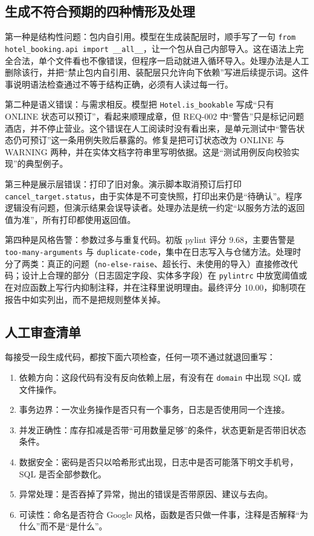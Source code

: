 \documentclass[11pt,a4paper,fontset=none]{ctexart}
\begin{document}
\subsection{生成不符合预期的四种情形及处理}

第一种是结构性问题：包内自引用。模型在生成装配层时，顺手写了一句 \texttt{from hotel\_booking.api import \_\_all\_\_}，让一个包从自己内部导入。这在语法上完全合法，单个文件看也不像错误，但程序一启动就进入循环导入。处理办法是人工删除该行，并把“禁止包内自引用、装配层只允许向下依赖”写进后续提示词。这件事说明语法检查通过不等于结构正确，必须有人读过每一行。

第二种是语义错误：与需求相反。模型把 \texttt{Hotel.is\_bookable} 写成“只有 ONLINE 状态可以预订”，看起来顺理成章，但 REQ-002 中“警告”只是标记问题酒店，并不停止营业。这个错误在人工阅读时没有看出来，是单元测试中“警告状态仍可预订”这一条用例失败后暴露的。修复是把可订状态改为 ONLINE 与 WARNING 两种，并在实体文档字符串里写明依据。这是“测试用例反向校验实现”的典型例子。

第三种是展示层错误：打印了旧对象。演示脚本取消预订后打印 \texttt{cancel\_target.status}，由于实体是不可变快照，打印出来仍是“待确认”。程序逻辑没有问题，但演示结果会误导读者。处理办法是统一约定“以服务方法的返回值为准”，所有打印都使用返回值。

第四种是风格告警：参数过多与重复代码。初版 pylint 评分 9.68，主要告警是 \texttt{too-many-arguments} 与 \texttt{duplicate-code}，集中在日志写入与仓储方法。处理时分了两类：真正的问题（\texttt{no-else-raise}、超长行、未使用的导入）直接修改代码；设计上合理的部分（日志固定字段、实体多字段）在 \texttt{pylintrc} 中放宽阈值或在对应函数上写行内抑制注释，并在注释里说明理由。最终评分 10.00，抑制项在报告中如实列出，而不是把规则整体关掉。

\subsection{人工审查清单}

每接受一段生成代码，都按下面六项检查，任何一项不通过就退回重写：

\begin{enumerate}[leftmargin=2.2em,itemsep=0.2em]
\item 依赖方向：这段代码有没有反向依赖上层，有没有在 \texttt{domain} 中出现 SQL 或文件操作。
\item 事务边界：一次业务操作是否只有一个事务，日志是否使用同一个连接。
\item 并发正确性：库存扣减是否带“可用数量足够”的条件，状态更新是否带旧状态条件。
\item 数据安全：密码是否只以哈希形式出现，日志中是否可能落下明文手机号，SQL 是否全部参数化。
\item 异常处理：是否吞掉了异常，抛出的错误是否带原因、建议与去向。
\item 可读性：命名是否符合 Google 风格，函数是否只做一件事，注释是否解释“为什么”而不是“是什么”。
\end{enumerate}
\end{document}
